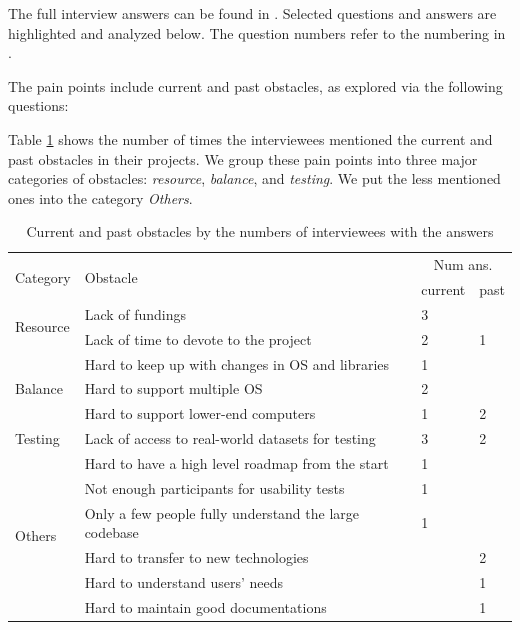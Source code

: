 \documentclass[final, 3p, times, authoryear]{elsarticle}
\begin{document}
The full interview answers can be found in \citet{Dong2021}.  Selected questions
and answers are highlighted and analyzed below.  The question numbers refer to
the numbering in \citet{SmithEtAl2021}.


The pain points include current and past obstacles, as explored via the
following questions:


Table \ref{tab_obstacles} shows the number of times the interviewees mentioned
the current and past obstacles in their projects.   We group these pain points
into three major categories of obstacles: \textit{resource}, \textit{balance},
and \textit{testing}. We put the less mentioned ones into the category
\textit{Others}. 

\begin{table}[!ht]
\centering
\begin{tabular}{llll}
\toprule
\multirow{2}{*}{Category} & \multirow{2}{*}{Obstacle} & \multicolumn{2}{c}{Num
 ans.} \\ \cline{3-4} &  & current & past \\ 
\midrule
\multirow{2}{*}{Resource} & Lack of fundings & 3 &  \\
 & Lack of time to devote to the project & 2 & 1 \\ 
\midrule
\multirow{3}{*}{Balance} & Hard to keep up with changes in OS and libraries & 1 &  \\
 & Hard to support multiple OS & 2 &  \\
 & Hard to support lower-end computers & 1 & 2 \\ 
\midrule
Testing & Lack of access to real-world datasets for testing & 3 & 2 \\ 
\midrule
\multirow{7}{*}{Others}
 & Hard to have a high level roadmap from the start & 1 &  \\
 & Not enough participants for usability tests & 1 &  \\
 & Only a few people fully understand the large codebase & 1 &  \\
 & Hard to transfer to new technologies & & 2 \\
 & Hard to understand users' needs & & 1 \\
 & Hard to maintain good documentations & & 1 \\ 
\bottomrule
\end{tabular}
\caption{\label{tab_obstacles}Current and past obstacles by the numbers of interviewees with the answers}
\end{table}
\end{document}
